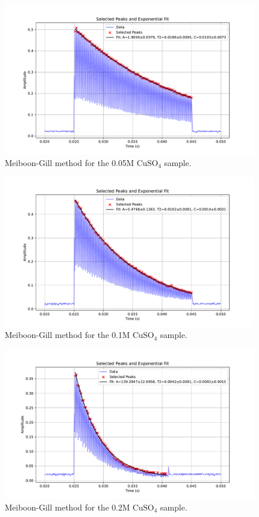 \documentclass[12pt]{article}
\begin{document}
\begin{figure}[H]
  \includegraphics[scale = 0.5]{MG_0.05.pdf}
  \caption{Meiboon-Gill method for the 0.05M $\text{CuSO}_4$ sample.}
  \label{MG_0.05.pdf}
\end{figure}
\begin{figure}[H]
  \includegraphics[scale = 0.5]{MG_0.1.pdf}
  \caption{Meiboon-Gill method for the 0.1M $\text{CuSO}_4$ sample.}
  \label{MG_0.1.pdf}
\end{figure}
\begin{figure}[H]
  \includegraphics[scale = 0.5]{MG_0.2.pdf}
  \caption{Meiboon-Gill method for the 0.2M $\text{CuSO}_4$ sample.}
  \label{MG_0.2.pdf}
\end{figure}
\end{document}
